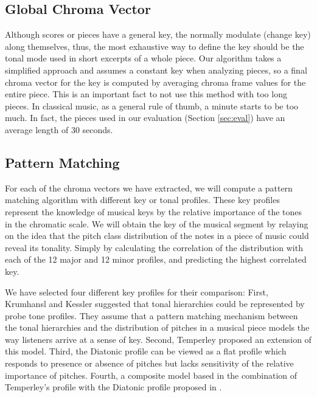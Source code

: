 \documentclass{article}
\begin{document}
\subsection{Global Chroma Vector} %
Although scores or pieces have a general key, the normally modulate (change key) along themselves, thus, the most exhaustive way to define the key should be the tonal mode used in short excerpts of a whole piece. Our algorithm takes a simplified approach and assumes a constant key when analyzing pieces, so a final chroma vector for the key is computed by averaging chroma frame values for the entire piece. This is an important fact to not use this method with too long pieces. In classical music, as a general rule of thumb, a minute starts to be too much. In fact, the pieces used in our evaluation (Section \ref{sec:eval}) have an average length of 30 seconds.

\subsection{Pattern Matching}	%
For each of the chroma vectors we have extracted, we will compute a pattern matching algorithm with different key or tonal profiles. These key profiles represent the knowledge of musical keys by the relative importance of the tones in the chromatic scale. We will obtain the key of the musical segment by relaying on the idea that the pitch class distribution of the notes in a piece of music could reveal its tonality. Simply by calculating the correlation of the distribution with each of the 12 major and 12 minor profiles, and predicting the highest correlated key. %

We have selected four different key profiles for their comparison: First, Krumhansl and Kessler\cite{Author:Krumhansl} suggested that tonal hierarchies could be represented by probe tone profiles. They assume that a pattern matching mechanism between the tonal hierarchies and the distribution of pitches in a musical piece models the way listeners arrive at a sense of key. Second, Temperley \cite{Author:Temperley} proposed an extension of this model. Third, the Diatonic profile can be viewed as a flat profile which responds to presence or absence of pitches but lacks sensitivity of the relative importance of pitches. Fourth, a composite model based in the combination of Temperley's profile with the Diatonic profile proposed in \cite{Author:Izmirli}.
\end{document}
